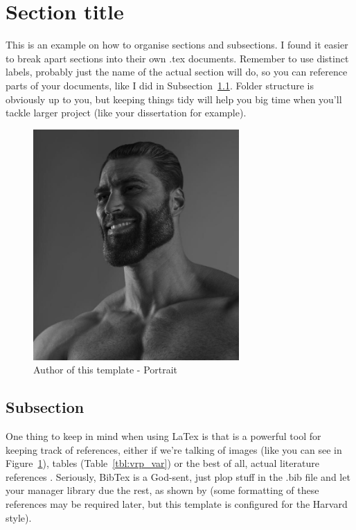 \section{Section title}\label{section_label}
This is an example on how to organise sections and subsections. I found it easier to break apart sections into their own .tex documents. Remember to use distinct labels, probably just the name of the actual section will do, so you can reference parts of your documents, like I did in Subsection~\ref{subsection}.
Folder structure is obviously up to you, but keeping things tidy will help you big time when you'll tackle larger project (like your
dissertation for example).

\begin{figure}[H]
    \centering
    \includegraphics[width=0.7\textwidth]{img/author.jpg}
    \caption{Author of this template - Portrait}
    \label{fig:example}
\end{figure}

\subsection{Subsection}\label{subsection}
One thing to keep in mind when using LaTex is that is a powerful tool for keeping track of references, either if we're talking of images (like you can see in Figure~\ref{fig:example}),
tables (Table~\ref{tbl:vrp_var}) or the best of all, actual literature references \parencite{fletcher1995academic}. Seriously, BibTex is a God-sent, just plop stuff in the .bib file and let your manager library due the rest, as shown by \textcite{patashnik1984bibtex} (some formatting of these references may be required later, but this template is configured for the Harvard style). 

